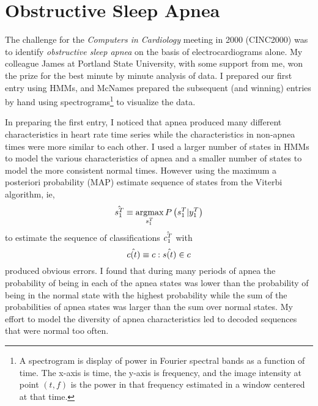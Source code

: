 \chapter{Obstructive Sleep Apnea}
\label{chap:apnea}

The challenge for the \emph{Computers in Cardiology} %
%
meeting in 2000 (CINC2000) %
%
was to identify \emph{obstructive sleep apnea} on the basis of
electrocardiograms alone.  My colleague James  at
Portland State University, with some support from me, won the prize
for the best minute by minute analysis of data.  I prepared our first
entry using HMMs, and McNames prepared the subsequent (and winning)
entries by hand using spectrograms\footnote{A spectrogram is display
  of power in Fourier spectral bands as a function of time.  The
  x-axis is time, the y-axis is frequency, and the image intensity at
  point $(t,f)$ is the power in that frequency estimated in a window
  centered at that time.} to visualize the data.  

In preparing the first entry, I noticed that apnea produced many
different characteristics in heart rate time series while the
characteristics in non-apnea times were more similar to each other.  I
used a larger number of states in HMMs to model the various
characteristics of apnea and a smaller number of states to model the
more consistent normal times.  However using the maximum a posteriori
probability (MAP) estimate sequence of states from the Viterbi
algorithm, ie,
\begin{equation*}
  \hat {s_{1}^{T}} \equiv
  \operatorname*{argmax}_{s_{1}^{T}}P\left(s_{1}^{T} | y_{1}^{T} \right)
\end{equation*}
to estimate the sequence of classifications $\hat {c_{1}^{T}}$ with
\begin{equation*}
  \hat {{c}{(t)}} \equiv c:\hat {{s}{(t)}} \in c
\end{equation*}
produced obvious errors.  I found that during many periods of apnea
the probability of being in each of the apnea states was lower than
the probability of being in the normal state with the highest
probability while the sum of the probabilities of apnea states was
larger than the sum over normal states.  My effort to model the
diversity of apnea characteristics led to decoded sequences that were
normal too often.

